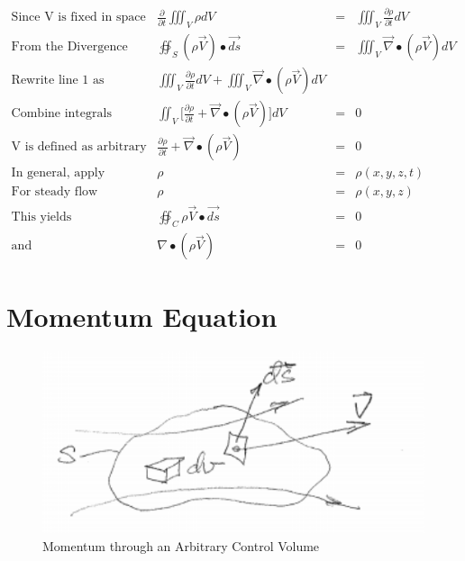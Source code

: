 \documentclass[draft=false, titlepage]{article}
\newcommand{\gradient}{\vec{\nabla}}
\begin{document}
\begin{equation*}
    \renewcommand{\arraystretch}{1.5}
    \begin{array}{lrcl}
         \text{Since V is fixed in space (fixed control volume)} &
        \frac{\partial}{\partial t} \iiint_V \rho dV &=& \iiint_V \frac{\partial \rho}{\partial t} dV \\
        
        \text{From the Divergence Theorem} &
        \oiint_S (\rho \vec{V}) \bullet \vec{ds} &=& \iiint_V \gradient \bullet (\rho \vec{V}) dV \\
        
        \text{Rewrite line 1 as} &
        \iiint_V \frac{\partial \rho}{\partial t} dV + \iiint_V \gradient \bullet (\rho \vec{V}) dV \\
        
        \text{Combine integrals} &
        \iint_V \Big[ \frac{\partial \rho}{\partial t} + \gradient \bullet (\rho \vec{V}) \Big] dV &=& 0 \\
        
        \text{V is defined as arbitrary (switch to differential form)} &
        \frac{\partial \rho}{\partial t} + \gradient \bullet (\rho \vec{V}) &=& 0 \\
        
        \text{In general, apply} & \rho &=& \rho(x, y, z, t) \\
        \text{For steady flow} & \rho &=& \rho(x, y, z) \\
        \text{This yields} & \oiint_C \rho \vec{V} \bullet \vec{ds} &=& 0 \\
        \text{and} & \nabla \bullet (\rho \vec{V}) &=& 0

    \end{array}
\end{equation*}

\section{Momentum Equation}
\begin{figure}
    \centering
    \includegraphics[width=0.4\linewidth]{Figures/momentum_CV.PNG}
    \caption{Momentum through an Arbitrary Control Volume}
    \label{fig:momentum_CV}
\end{figure}
\end{document}
